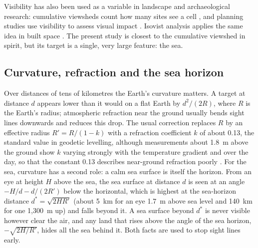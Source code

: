 Visibility has also been used as a variable in landscape and archaeological research: cumulative viewsheds count how many sites see a cell \citep{wheatley1995}, and planning studies use visibility to assess visual impact \citep{bishop2003}. Isovist analysis applies the same idea in built space \citep{benedikt1979}. The present study is closest to the cumulative viewshed in spirit, but its target is a single, very large feature: the sea.

\subsection{Curvature, refraction and the sea horizon}
Over distances of tens of kilometres the Earth's curvature matters. A target at distance $d$ appears lower than it would on a flat Earth by $d^2/(2R)$, where $R$ is the Earth's radius; atmospheric refraction near the ground usually bends sight lines downwards and reduces this drop. The usual correction replaces $R$ by an effective radius $R' = R/(1-k)$ with a refraction coefficient $k$ of about 0.13, the standard value in geodetic levelling, although measurements about 1.8~m above the ground show $k$ varying strongly with the temperature gradient and over the day, so that the constant 0.13 describes near-ground refraction poorly \citep{hirt2010}. For the sea, curvature has a second role: a calm sea surface is itself the horizon. From an eye at height $H$ above the sea, the sea surface at distance $d$ is seen at an angle $-H/d - d/(2R')$ below the horizontal, which is highest at the sea-horizon distance $d^\ast = \sqrt{2HR'}$ (about 5~km for an eye 1.7~m above sea level and 140~km for one 1,300~m up) and falls beyond it. A sea surface beyond $d^\ast$ is never visible however clear the air, and any land that rises above the angle of the sea horizon, $-\sqrt{2H/R'}$, hides all the sea behind it. Both facts are used to stop sight lines early.

